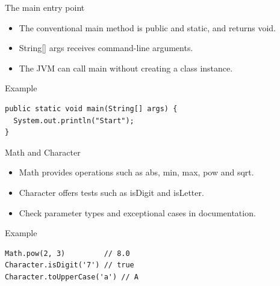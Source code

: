 \documentclass[10pt,aspectratio=169]{beamer}
\begin{document}
\begin{frame}[fragile,t]{The main entry point}
\begin{itemize}
\item The conventional main method is public and static, and returns void.
\item String[] args receives command-line arguments.
\item The JVM can call main without creating a class instance.
\end{itemize}
\vspace{1mm}\begin{block}{Example}
\begin{lstlisting}
public static void main(String[] args) {
  System.out.println("Start");
}
\end{lstlisting}
\end{block}
\end{frame}

\begin{frame}[fragile,t]{Math and Character}
\begin{itemize}
\item Math provides operations such as abs, min, max, pow and sqrt.
\item Character offers tests such as isDigit and isLetter.
\item Check parameter types and exceptional cases in documentation.
\end{itemize}
\vspace{1mm}\begin{block}{Example}
\begin{lstlisting}
Math.pow(2, 3)         // 8.0
Character.isDigit('7') // true
Character.toUpperCase('a') // A
\end{lstlisting}
\end{block}
\end{frame}
\end{document}
